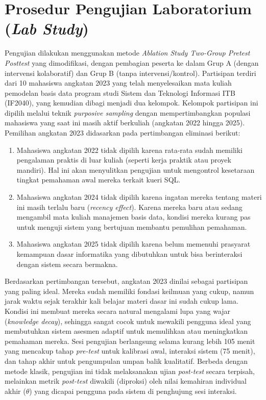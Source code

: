 

\section{Prosedur Pengujian Laboratorium (\textit{Lab Study})}
\label{sec:prosedur_pengujian}

Pengujian dilakukan menggunakan metode \textit{Ablation Study Two-Group Pretest Posttest} yang dimodifikasi, dengan pembagian peserta ke dalam Grup A (dengan intervensi kolaboratif) dan Grup B (tanpa intervensi/kontrol). Partisipan terdiri dari 10 mahasiswa angkatan 2023 yang telah menyelesaikan mata kuliah pemodelan basis data program studi Sistem dan Teknologi Informasi ITB (IF2040), yang kemudian dibagi menjadi dua kelompok. Kelompok partisipan ini dipilih melalui teknik \textit{purposive sampling} dengan mempertimbangkan populasi mahasiswa yang saat ini masih aktif berkuliah (angkatan 2022 hingga 2025). Pemilihan angkatan 2023 didasarkan pada pertimbangan eliminasi berikut:
\begin{enumerate}
    \item Mahasiswa angkatan 2022 tidak dipilih karena rata-rata sudah memiliki pengalaman praktis di luar kuliah (seperti kerja praktik atau proyek mandiri). Hal ini akan menyulitkan pengujian untuk mengontrol kesetaraan tingkat pemahaman awal mereka terkait kueri SQL.
    \item Mahasiswa angkatan 2024 tidak dipilih karena ingatan mereka tentang materi ini masih terlalu baru (\textit{recency effect}). Karena mereka baru atau sedang mengambil mata kuliah manajemen basis data, kondisi mereka kurang pas untuk menguji sistem yang bertujuan membantu pemulihan pemahaman.
    \item Mahasiswa angkatan 2025 tidak dipilih karena belum memenuhi prasyarat kemampuan dasar informatika yang dibutuhkan untuk bisa berinteraksi dengan sistem secara bermakna.
\end{enumerate}
Berdasarkan pertimbangan tersebut, angkatan 2023 dinilai sebagai partisipan yang paling ideal. Mereka sudah memiliki fondasi keilmuan yang cukup, namun jarak waktu sejak terakhir kali belajar materi dasar ini sudah cukup lama. Kondisi ini membuat mereka secara natural mengalami lupa yang wajar (\textit{knowledge decay}), sehingga sangat cocok untuk mewakili pengguna ideal yang membutuhkan sistem asesmen adaptif untuk memulihkan atau meningkatkan pemahaman mereka.
Sesi pengujian berlangsung selama kurang lebih 105 menit yang mencakup tahap \textit{pre-test} untuk kalibrasi awal, interaksi sistem (75 menit), dan tahap akhir untuk pengumpulan umpan balik kualitatif. Berbeda dengan metode klasik, pengujian ini tidak melaksanakan ujian \textit{post-test} secara terpisah, melainkan metrik \textit{post-test} diwakili (diproksi) oleh nilai kemahiran individual akhir ($\theta$) yang dicapai pengguna pada sistem di penghujung sesi interaksi.

